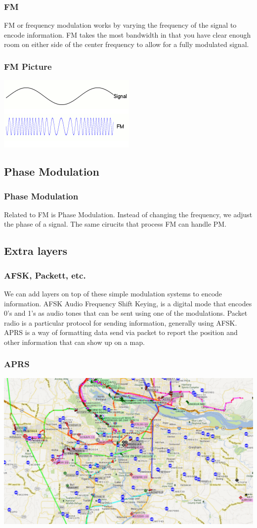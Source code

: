 \documentclass[10pt]{beamer}
\begin{document}
\begin{frame}
\frametitle{FM}
FM or frequency modulation works by varying the frequency of the signal to encode information. FM takes the most bandwidth in that you have clear enough room on either side of the center frequency to allow for a fully modulated signal.
\end{frame}

\begin{frame}
\frametitle{FM Picture}
\includegraphics[height=.5\textheight]{fm.png}
\end{frame}

\subsection{Phase Modulation}

\begin{frame}
\frametitle{Phase Modulation}
Related to FM is Phase Modulation. Instead of changing the frequency, we adjust the phase of a signal. The same cirucits that process FM can handle PM.
\end{frame}

\subsection{Extra layers}
\begin{frame}
\frametitle{AFSK, Packett, etc.}
We can add layers on top of these simple modulation systems to encode information. AFSK Audio Frequency Shift Keying, is a digital mode that encodes 0's and 1's as audio tones that can be sent using one of the modulations. Packet radio is a particular protocol for sending information, generally using AFSK. APRS is a way of formatting data send via packet to report the position and other information that can show up on a map.
\end{frame}

\begin{frame}
\frametitle{APRS}
\includegraphics[width=.9\textwidth]{aprspdx.png}
\end{frame}
\end{document}
